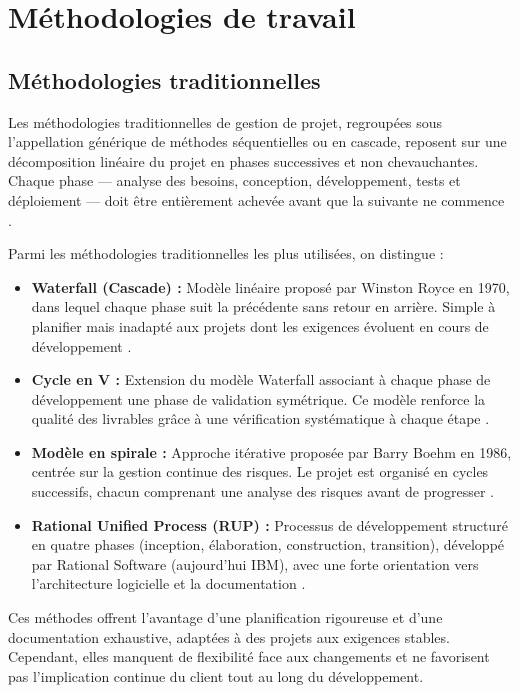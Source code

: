 \documentclass[12pt,a4paper]{report}
\begin{document}
\section{Méthodologies de travail}

\subsection{Méthodologies traditionnelles}

Les méthodologies traditionnelles de gestion de projet, regroupées sous l'appellation générique de méthodes séquentielles ou en cascade, reposent sur une décomposition linéaire du projet en phases successives et non chevauchantes. Chaque phase --- analyse des besoins, conception, développement, tests et déploiement --- doit être entièrement achevée avant que la suivante ne commence \cite{royce_waterfall}.

Parmi les méthodologies traditionnelles les plus utilisées, on distingue :

\begin{itemize}[leftmargin=*, label=\textbullet]
    \item \textbf{Waterfall (Cascade) :} Modèle linéaire proposé par Winston Royce en 1970, dans lequel chaque phase suit la précédente sans retour en arrière. Simple à planifier mais inadapté aux projets dont les exigences évoluent en cours de développement \cite{royce_waterfall}.
    \item \textbf{Cycle en V :} Extension du modèle Waterfall associant à chaque phase de développement une phase de validation symétrique. Ce modèle renforce la qualité des livrables grâce à une vérification systématique à chaque étape \cite{forsberg_v_model}.
    \item \textbf{Modèle en spirale :} Approche itérative proposée par Barry Boehm en 1986, centrée sur la gestion continue des risques. Le projet est organisé en cycles successifs, chacun comprenant une analyse des risques avant de progresser \cite{boehm_spiral}.
    \item \textbf{Rational Unified Process (RUP) :} Processus de développement structuré en quatre phases (inception, élaboration, construction, transition), développé par Rational Software (aujourd'hui IBM), avec une forte orientation vers l'architecture logicielle et la documentation \cite{kruchten_rup}.
\end{itemize}

Ces méthodes offrent l'avantage d'une planification rigoureuse et d'une documentation exhaustive, adaptées à des projets aux exigences stables. Cependant, elles manquent de flexibilité face aux changements et ne favorisent pas l'implication continue du client tout au long du développement.
\end{document}
